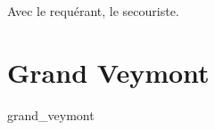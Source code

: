 \chaptertoc{}


Avec  le requérant,  le secouriste.

\section{Grand Veymont}
\label{anx:retrans_grand_veymont}
{grand_veymont}









